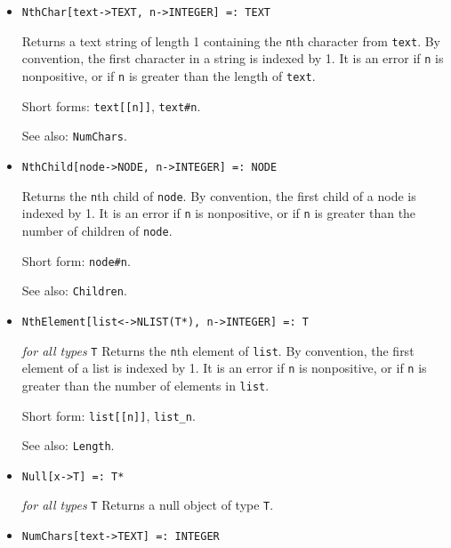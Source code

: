 \begin{itemize}
\item{}
\protect \large \begin{verbatim}
NthChar[text->TEXT, n->INTEGER] =: TEXT 
\end{verbatim}\normalsize

\bd
Returns a text string of length 1 containing the \verb+n+th
character from \verb+text+.  By convention, the first character
in a string is indexed by 1.  It is an error if \verb+n+ is nonpositive,
or if \verb+n+ is greater than the length of \verb+text+.
\item [Short forms:] \verb+text[[n]]+, \verb+text#n+.
\item [See also:] \verb+NumChars+.
\ed

\item{}
\protect \large \begin{verbatim} 
NthChild[node->NODE, n->INTEGER] =: NODE 
\end{verbatim}\normalsize

\bd
Returns the \verb+n+th child of \verb+node+.
By convention, the first child of a node is indexed by 1.
It is an error if \verb+n+ is nonpositive, or if \verb+n+ is greater
than the number of children of \verb+node+.
\item [Short form:] \verb+node#n+.
\item [See also:] \verb+Children+.
\ed

\item{}
\protect \large \begin{verbatim}
NthElement[list<->NLIST(T*), n->INTEGER] =: T 
\end{verbatim}\normalsize

{\it for all types} {\tt T}
\bd
Returns the \verb+n+th element of \verb+list+.
By convention, the first element of a list is indexed by 1.
It is an error if \verb+n+ is nonpositive, or if \verb+n+ is greater
than the number of elements in \verb+list+.
\item [Short form:] \verb+list[[n]]+, \verb+list_n+.
\item [See also:] \verb+Length+.
\ed

\item{}
\protect \large \begin{verbatim}
Null[x->T] =: T*
\end{verbatim}\normalsize

{\it for all types} {\tt T}
\bd
Returns a null object of type \verb+T+.  
\ed

\item{}
\protect \large \begin{verbatim}
NumChars[text->TEXT] =: INTEGER 
\end{verbatim}\normalsize


\end{itemize}
